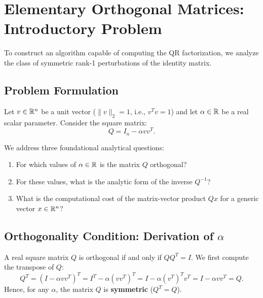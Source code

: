 \FloatBarrier
\section{Elementary Orthogonal Matrices: Introductory Problem}
\label{sec:elementary-orthogonal-matrices-en}

To construct an algorithm capable of computing the QR factorization, we analyze the class of symmetric rank-1 perturbations of the identity matrix.

\subsection{Problem Formulation}
Let $v \in \mathbb{R}^n$ be a unit vector ($\|v\|_2 = 1$, i.e., $v^T v = 1$) and let $\alpha \in \mathbb{R}$ be a real scalar parameter. Consider the square matrix:
\begin{equation}
    Q = I_n - \alpha v v^T.
    \label{eq:form-matrix-alpha-en}
\end{equation}

We address three foundational analytical questions:
\begin{enumerate}
    \item For which values of $\alpha \in \mathbb{R}$ is the matrix $Q$ orthogonal?
    \item For these values, what is the analytic form of the inverse $Q^{-1}$?
    \item What is the computational cost of the matrix-vector product $Q x$ for a generic vector $x \in \mathbb{R}^n$?
\end{enumerate}

\subsection{Orthogonality Condition: Derivation of $\alpha$}
A real square matrix $Q$ is orthogonal if and only if $Q Q^T = I$.
We first compute the transpose of $Q$:
\begin{equation}
    Q^T = (I - \alpha v v^T)^T = I^T - \alpha (v v^T)^T = I - \alpha (v^T)^T v^T = I - \alpha v v^T = Q.
\end{equation}
Hence, for any $\alpha$, the matrix $Q$ is \textbf{symmetric} ($Q^T = Q$).

